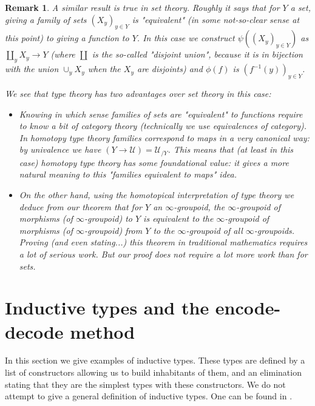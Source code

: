 \documentclass{article}
\newcommand{\se}[1]{\medbreak \medbreak \section{#1}}
\newcommand{\U}{{\mathcal U}}
\renewcommand{\r}{\rightarrow}
\newtheorem{remark}{Remark}
\begin{document}
\begin{remark}
A similar result is true in set theory. Roughly it says that for $Y$ a set, giving a family of sets $(X_y)_{y\in Y}$ is "equivalent" (in some not-so-clear sense at this point) to giving a function to $Y$. In this case we construct $\psi((X_y)_{y\in Y})$ as $\coprod_y X_y \r Y$ (where $\coprod$ is the so-called "disjoint union", because it is in bijection with the union $\cup_yX_y$ when the $X_y$ are disjoints) and $\phi(f)$ is $(f^{-1}(y))_{y\in Y}$.

We see that type theory has two advantages over set theory in this case:
\begin{itemize}
\item Knowing in which sense families of sets are "equivalent" to functions require to know a bit of category theory (technically we use equivalences of category). In homotopy type theory families correspond to maps in a very canonical way: by univalence we have $(Y\r \U) = \U_{/Y}$. This means that (at least in this case) homotopy type theory has some foundational value: it gives a more natural meaning to this "families equivalent to maps" idea. %
\item On the other hand, using the homotopical interpretation of type theory we deduce from our theorem that for $Y$ an $\infty$-groupoid, the $\infty$-groupoid of morphisms (of $\infty$-groupoid) to $Y$ is equivalent to the $\infty$-groupoid of morphisms (of $\infty$-groupoid) from $Y$ to the $\infty$-groupoid of all $\infty$-groupoids. Proving (and even stating...) this theorem in traditional mathematics requires a lot of serious work. But our proof does not require a lot more work than for sets.
\end{itemize}
\end{remark}







\se{Inductive types and the encode-decode method}

In this section we give examples of inductive types. These types are defined by a list of constructors allowing us to build inhabitants of them, and an elimination stating that they are the simplest types with these constructors. We do not attempt to give a general definition of inductive types. One can be found in \cite{dybjer1994inductive}. %
\end{document}
